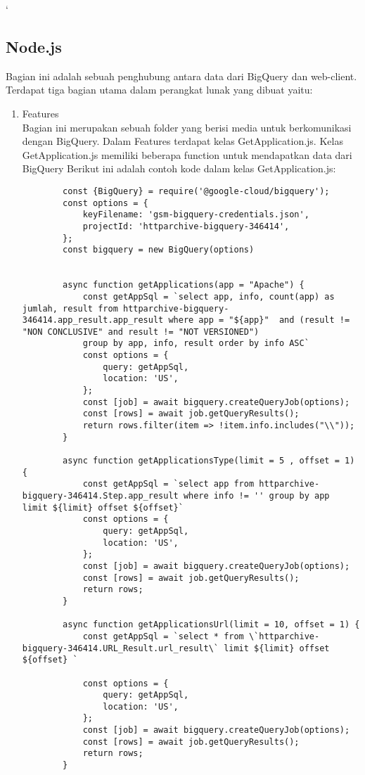 `\subsection{Node.js}
Bagian ini adalah sebuah penghubung antara data dari BigQuery dan web-client. Terdapat tiga bagian utama dalam perangkat lunak yang dibuat yaitu:
\begin{enumerate}
	\item Features\\
	Bagian ini merupakan sebuah folder yang berisi media untuk berkomunikasi dengan BigQuery. Dalam Features terdapat kelas GetApplication.js. Kelas GetApplication.js memiliki beberapa function untuk mendapatkan data dari BigQuery Berikut ini adalah contoh kode dalam kelas GetApplication.js:
	\begin{lstlisting}
		const {BigQuery} = require('@google-cloud/bigquery');
		const options = {
			keyFilename: 'gsm-bigquery-credentials.json',
			projectId: 'httparchive-bigquery-346414',
		};
		const bigquery = new BigQuery(options)
		
		
		async function getApplications(app = "Apache") {
			const getAppSql = `select app, info, count(app) as jumlah, result from httparchive-bigquery-346414.app_result.app_result where app = "${app}"  and (result != "NON CONCLUSIVE" and result != "NOT VERSIONED")
			group by app, info, result order by info ASC`
			const options = {
				query: getAppSql,
				location: 'US',
			};
			const [job] = await bigquery.createQueryJob(options);
			const [rows] = await job.getQueryResults();
			return rows.filter(item => !item.info.includes("\\"));
		}
		
		async function getApplicationsType(limit = 5 , offset = 1) {
			const getAppSql = `select app from httparchive-bigquery-346414.Step.app_result where info != '' group by app  limit ${limit} offset ${offset}`
			const options = {
				query: getAppSql,
				location: 'US',
			};
			const [job] = await bigquery.createQueryJob(options);
			const [rows] = await job.getQueryResults();
			return rows;
		}
		
		async function getApplicationsUrl(limit = 10, offset = 1) {
			const getAppSql = `select * from \`httparchive-bigquery-346414.URL_Result.url_result\` limit ${limit} offset ${offset} `
			
			const options = {
				query: getAppSql,
				location: 'US',
			};
			const [job] = await bigquery.createQueryJob(options);
			const [rows] = await job.getQueryResults();
			return rows;
		}
		

\end{lstlisting}
\end{enumerate}
